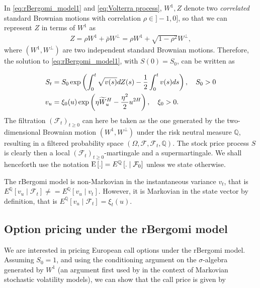 In \eqref{eq:rBergomi_model1} and \eqref{eq:Volterra process}, $W^1, Z$ denote two \emph{correlated} standard Brownian motions with correlation $\rho \in ]-1,0]$, so that we can represent $Z$ in terms of $W^1$ as
\begin{align*}
	Z=\rho	W^1+ \bar{\rho}W^\perp = \rho W^1+\sqrt{1-\rho^2} W^\perp,
\end{align*}
where $(W^1,W^\perp)$ are two independent standard Brownian motions.
Therefore, the solution to \eqref{eq:rBergomi_model1}, with $S(0)=S_0$, can be written as 

\begin{align}\label{eq:rBergomi_model}
	S_t&= S_0  \operatorname{exp}\left( \int_{0}^{t} \sqrt{v(s)} dZ(s)- \frac{1}{2} \int_{0}^{t} v(s) ds   \right),\quad S_0>0 \nonumber\\
	v_u&=\xi_0(u) \operatorname{exp}\left( \eta \widetilde{W}_u^H- \frac{\eta^2}{2} u^{2H} \right), \quad \xi_0>0 .
\end{align}
The filtration $(\mathcal{F}_t)_{t\ge 0}$ can here be taken as the one generated by the two-dimensional Brownian motion $(W^1,W^\perp)$ under the risk neutral measure $\mathbb{Q}$, resulting in  a filtered probability space $(\Omega,\mathcal{F}, \mathcal{F}_t,\mathbb{Q})$. The stock price process $S$ is clearly then a local
$(\mathcal{F}_t)_{t\ge 0}$-martingale and a supermartingale.  We shall henceforth use the notation $\mathrm{E}\left[.\right] = E^{\mathbb{Q}}\left[. \mid \mathcal{F}_0\right]$ unless we state otherwise.
\begin{remark}
The rBergomi model is non-Markovian in the instantaneous variance $v_t$, that is $E^{\mathbb{Q}}\left[v_u\mid \mathcal{F}_t\right] \neq= E^{\mathbb{Q}}\left[v_u\mid v_t\right]$. However, it is Markovian in the state vector by definition, that is $E^{\mathbb{Q}}\left[v_u\mid\mathcal{F}_t\right]=\xi_t(u)$.
\end{remark}
\subsection{Option pricing under the rBergomi model}\label{sec:Option pricing under rBergomi model}

We are interested in pricing European call options under the rBergomi model. Assuming $S_0 = 1$, and using the conditioning argument on the $\sigma$-algebra generated by $W^1$ (an argument first used by \cite{romano1997contingent} in the context of Markovian stochastic volatility  models), we can  show that the call price is given by

